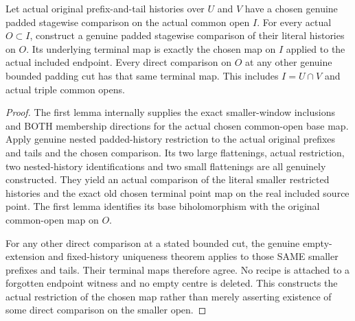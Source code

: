 \begin{theorem}
\label{hir:sharp-actual-chosen-overlap-map-restriction}
\leanok
Let actual original prefix-and-tail histories over $U$ and $V$ have a chosen
genuine padded stagewise comparison on the actual common open $I$.
For every actual $O\subset I$, construct a genuine padded stagewise
comparison of their literal histories on $O$. Its underlying terminal map
is exactly the chosen map on $I$ applied to the actual included endpoint.
Every direct comparison on $O$ at any other genuine bounded padding cut
has that same terminal map. This includes $I=U\cap V$ and actual triple
common opens.
\end{theorem}
\begin{proof}
The first lemma internally supplies the exact smaller-window inclusions and
BOTH membership directions for the actual chosen common-open base map.
Apply genuine nested padded-history restriction to the actual original
prefixes and tails and the chosen comparison. Its two large flattenings,
actual restriction, two nested-history identifications and two small
flattenings are all genuinely constructed. They yield an actual comparison
of the literal smaller restricted histories and the exact old chosen
terminal point map on the real included source point. The first lemma
identifies its base biholomorphism with the original common-open map on $O$.

For any other direct comparison at a stated bounded cut, the genuine
empty-extension and fixed-history uniqueness theorem applies to those SAME
smaller prefixes and tails. Their terminal maps therefore agree. No recipe
is attached to a forgotten endpoint witness and no empty centre is deleted.
This constructs the actual restriction of the chosen map rather than merely
asserting existence of some direct comparison on the smaller open.
\end{proof}

